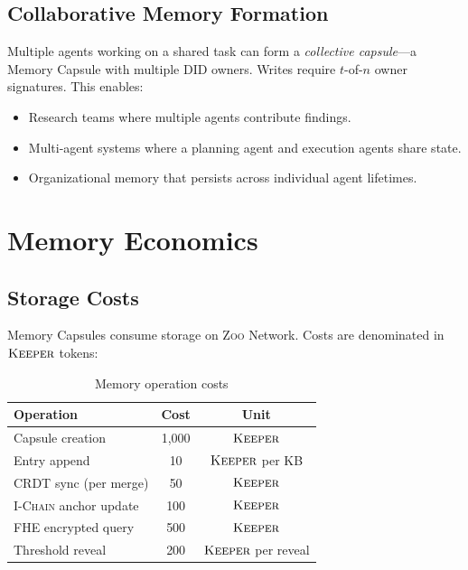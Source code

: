 \documentclass[11pt,letterpaper]{article}
\theoremstyle{definition}
\theoremstyle{remark}
\newcommand{\Zoo}{\textsc{Zoo}}
\newcommand{\IChain}{\textsc{I-Chain}}
\newcommand{\DID}{\textsc{DID}}
\newcommand{\KEEPER}{\textsc{Keeper}}
\begin{document}
\subsection{Collaborative Memory Formation}

Multiple agents working on a shared task can form a \emph{collective capsule}---a Memory Capsule with multiple \DID{} owners. Writes require $t$-of-$n$ owner signatures. This enables:

\begin{itemize}
    \item Research teams where multiple agents contribute findings.
    \item Multi-agent systems where a planning agent and execution agents share state.
    \item Organizational memory that persists across individual agent lifetimes.
\end{itemize}

\section{Memory Economics}
\label{sec:economics}

\subsection{Storage Costs}

Memory Capsules consume storage on \Zoo{} Network. Costs are denominated in $\KEEPER$ tokens:

\begin{table}[h]
\centering
\begin{tabular}{lcc}
\toprule
\textbf{Operation} & \textbf{Cost} & \textbf{Unit} \\
\midrule
Capsule creation & 1,000 & $\KEEPER$ \\
Entry append & 10 & $\KEEPER$ per KB \\
CRDT sync (per merge) & 50 & $\KEEPER$ \\
\IChain{} anchor update & 100 & $\KEEPER$ \\
FHE encrypted query & 500 & $\KEEPER$ \\
Threshold reveal & 200 & $\KEEPER$ per reveal \\
\bottomrule
\end{tabular}
\caption{Memory operation costs}
\label{tab:costs}
\end{table}
\end{document}
